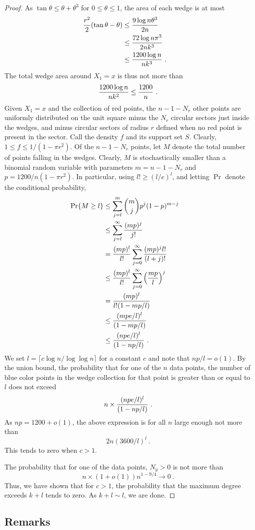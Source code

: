 \documentclass[lotsofwhite,charterfonts]{patmorin}
\newcommand{\PROB}{\Pr}
\begin{document}
\begin{proof}
As $\tan \theta \le \theta + \theta^3$ for $0 \le \theta \le 1$,
the area of each wedge is at most
\[
\begin{aligned}
{ r^2 \over 2} (\tan \theta - \theta)
&\le { 9 \log n \theta^3 \over 2n}  \cr
&\le { 72 \log n \pi^3 \over 2nk^3}  \cr
&\le { 1200 \log n \over n k^3} ~. \cr
\end{aligned}
\]
The total wedge area around $X_1 = x$ is thus not more
than
\[
{ 1200 \log n \over n k^2 } \le { 1200 \over n }~.
\]
Given $X_1 = x$ and the collection of red points,
the $n-1-N_r$ other points are uniformly distributed
on the unit square minus the $N_r$ circular
sectors just inside the wedges, and minus 
circular sectors of radius $r$ defined when no
red point is present in the sector. Call the density $f$
and its support set $S$. Clearly, 
$1 \le f 
\le 1/(1-\pi r^2)$.
Of the $n-1-N_r$ points, let $M$ denote the total
number of points falling in the wedges.
Clearly, $M$ is stochastically smaller
than a binomial random variable with parameters
$m = n-1-N_r$ and $p = 1200/n(1-\pi r^2)$.
In particular, using $l! \ge (l/e)^l$,
and letting $\PROB$ denote the conditional probability,
\[
\begin{aligned}
\PROB \{ M \ge l \}
&\le \sum_{j=l}^m {m \choose j} p^j (1-p)^{m-j} \cr
&\le \sum_{j=l}^\infty {(mp)^j \over j!}  \cr
&=   {(mp)^l \over l!} \sum_{j=0}^\infty {(mp)^j l! \over (l+j)!}  \cr
&\le {(mp)^l \over l!} \sum_{j=0}^\infty \left( {mp \over l} \right)^j  \cr
&=   {(mp)^l \over l! (1-mp/l)}  \cr
&\le   {(mpe/l)^l \over (1-mp/l)}  \cr
&\le   {(npe/l)^l \over (1-np/l)} ~. \cr
\end{aligned}
\]
We set $l = \lceil c \log n / \log \log n \rceil$ for a constant $c$
and note that $np/l = o(1)$.
By the union bound, 
the probability that for one of the $n$ data points,
the number of blue color points in the wedge collection
for that point is greater than or equal to $l$ does not
exceed 
\[
n \times {(npe/l)^l \over (1-np/l)} ~. 
\]
As $np = 1200+o(1)$, the above expression is for all $n$
large enough not more than
\[
2n (3600/l)^l~.
\]
This tends to zero when $c > 1$.

The probability that for one of the data points,
$N_y > 0$ is not more than
\[
n \times (1+o(1)) n^{1-9/4} \to 0~.
\]
Thus, we have shown that for $c > 1$, 
the probability that the maximum degree
exceeds $k+l$ tends to zero. As $k+l \sim l$, we are done.
\end{proof}

\subsection{Remarks}
\end{document}
